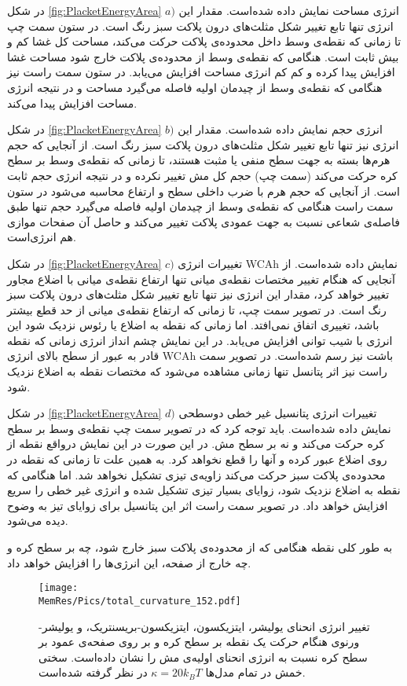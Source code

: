 در شکل 
\ref{fig:PlacketEnergyArea} $a)$
 انرژی مساحت نمایش داده شده‌است. مقدار این انرژی تنها تابع تغییر شکل مثلث‌های درون پلاکت سبز رنگ است. در ستون سمت چپ تا زمانی که نقطه‌ی وسط داخل محدوده‌ی پلاکت حرکت می‌کند، مساحت کل غشا کم و بیش ثابت است. هنگامی‌ که نقطه‌ی وسط از محدوده‌ی پلاکت خارج شود مساحت غشا افزایش پیدا کرده و کم کم انرژی مساحت افزایش می‌یابد. در ستون سمت راست نیز هنگامی که نقطه‌ی وسط از چیدمان اولیه فاصله می‌گیرد مساحت و در نتیجه انرژی مساحت افزایش پیدا می‌کند. 

در شکل 
\ref{fig:PlacketEnergyArea} $b)$
 انرژی حجم نمایش داده شده‌است. مقدار این انرژی نیز تنها تابع تغییر شکل مثلث‌های درون پلاکت سبز رنگ است. از آنجایی که حجم هرم‌ها بسته به جهت سطح منفی یا مثبت هستند، تا زمانی که نقطه‌ی وسط بر سطح کره حرکت می‌کند (سمت چپ) حجم کل مش تغییر نکرده و در نتیجه انرژی حجم ثابت است.‌ از آنجایی که حجم هرم با ضرب داخلی سطح و ارتفاع محاسبه می‌شود در ستون سمت راست  هنگامی که نقطه‌ی وسط از چیدمان اولیه فاصله می‌گیرد حجم تنها طبق فاصله‌ی شعاعی نسبت به جهت عمودی پلاکت تغییر می‌کند و حاصل آن صفحات موازی هم انرژی‌است.

در شکل 
\ref{fig:PlacketEnergyArea} $c)$
تغییرات انرژی 
WCAh
 نمایش داده شده‌است. از آنجایی که هنگام تغییر مختصات نقطه‌ی میانی تنها ارتفاع نقطه‌ی میانی با اضلاع مجاور تغییر خواهد کرد، مقدار این انرژی نیز تنها تابع تغییر شکل مثلث‌های درون پلاکت سبز رنگ است. در تصویر سمت چپ، تا زمانی که ارتفاع نقطه‌ی میانی از حد قطع بیشتر باشد، تغییری اتفاق نمی‌افتد. اما زمانی که نقطه به اضلاع یا رئوس نزدیک شود این انرژی با شیب توانی افزایش می‌یابد. در این نمایش چشم انداز انرژی زمانی که نقطه قادر به عبور از سطح بالای انرژی 
 WCAh
 باشت نیز رسم شده‌است. در تصویر سمت راست نیز اثر پتانسل تنها زمانی مشاهده می‌شود که مختصات نقطه به اضلاع نزدیک شود.
 
 در شکل 
\ref{fig:PlacketEnergyArea} $d)$
تغییرات انرژی پتانسیل غیر خطی دوسطحی نمایش داده شده‌است. باید توجه کرد که در تصویر سمت چپ نقطه‌ی وسط بر سطح کره حرکت می‌کند و نه بر سطح مش. در این صورت در این نمایش درواقع نقطه از روی اضلاع عبور کرده و آنها را قطع نخواهد کرد. به همین علت تا زمانی که نقطه در محدوده‌ی پلاکت سبز حرکت می‌کند زاویه‌ی تیزی تشکیل نخواهد شد. اما هنگامی که نقطه به اضلاع نزدیک شود، زوایای بسیار تیزی تشکیل شده و انرژی غیر خطی را سریع افزایش خواهد داد. در تصویر سمت راست اثر این پتانسیل برای زوایای تیز به وضوح دیده می‌شود.

به طور کلی نقطه هنگامی که از محدوده‌ی  پلاکت سبز خارج شود، چه بر سطح کره و چه خارج از صفحه‌، این انرژی‌ها را افزایش خواهد داد.

\begin{figure}[htbp]
\begin{center}
\texttt{[image: \\MemRes/Pics/total\_curvature\_152.pdf]}
\caption{
تغییر انرژی انحنای یولیشر، ایتزیکسون، ایتزیکسون-بریسنتریک، و یولیشر-ورنوی هنگام حرکت یک نقطه بر سطح کره و بر روی صفحه‌ی عمود بر سطح کره نسبت به انرژی انحنای اولیه‌ی مش را نشان داده‌است. سختی خمش در تمام مدل‌ها 
$\kappa=20k_BT$
در نظر گرفته شده‌است.
}
\label{fig:PlacketEnergy}
\end{center}
\end{figure}


